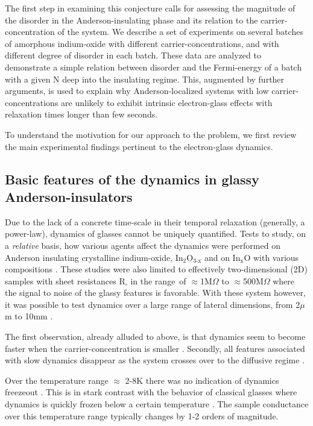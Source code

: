 \documentclass
[preprint,showpacs,byrevtex,10pt,twocolumn,tightenlines,prl,letterpaper]{revtex4}%
\begin{document}
The first step in examining this conjecture calls for assessing the magnitude
of the disorder in the Anderson-insulating phase and its relation to the
carrier-concentration of the system. We describe a set of experiments on
several batches of amorphous indium-oxide with different
carrier-concentrations, and with different degree of disorder in each batch.
These data are analyzed to demonstrate a simple relation between disorder and
the Fermi-energy of a batch with a given N deep into the insulating regime.
This, augmented by further arguments, is used to explain why
Anderson-localized systems with low carrier-concentrations are unlikely to
exhibit intrinsic electron-glass effects with relaxation times longer than few seconds.

To understand the motivation for our approach to the problem, we first review
the main experimental findings pertinent to the electron-glass dynamics.

\subsection{Basic features of the dynamics in glassy Anderson-insulators}

Due to the lack of a concrete time-scale in their temporal relaxation
(generally, a power-law), dynamics of glasses cannot be uniquely quantified.
Tests to study, on a \textit{relative} basis, how various agents affect the
dynamics were performed on Anderson insulating crystalline indium-oxide,
In$_{\text{2}}$O$_{\text{3-x}}$ and on In$_{\text{x}}$O with various
compositions \cite{23,27,29}. These studies were also limited to effectively
two-dimensional (2D) samples with sheet resistances R$_{\square}$ in the
range\ of $\approx$1M$\Omega$ to $\approx$500M$\Omega$ where the signal to
noise of the glassy features is favorable. With these system however, it was
possible to test dynamics over a large range of lateral dimensions, from
2$\mu$m to 10mm \cite{30}.

The first observation, already alluded to above, is that dynamics seem to
become faster when the carrier-concentration is smaller \cite{23}. Secondly,
all features associated with slow dynamics disappear as the system crosses
over to the diffusive regime \cite{22}.

Over the temperature range $\approx$ 2-8K there was no indication of dynamics
freezeout \cite{27,29}. This is in stark contrast with the behavior of
classical glasses where dynamics is quickly frozen below a certain temperature
\cite{31}. The sample conductance over this temperature range typically
changes by 1-2 orders of magnitude.
\end{document}
